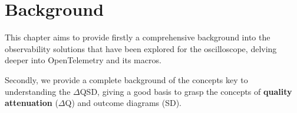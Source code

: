 \chapter{Background}
    This chapter aims to provide firstly a comprehensive background into the observability solutions that have been explored for the oscilloscope, delving deeper into OpenTelemetry and its macros.
    
    Secondly, we provide a complete background of the concepts key to understanding the $\Delta$QSD, giving a good basis to grasp the concepts of \textbf{quality attenuation} ($\Delta$Q) and outcome diagrams (SD). 


    
    
 
